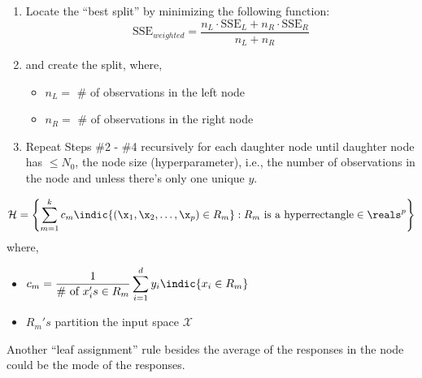 \documentclass[12pt]{article}
\begin{document}
\begin{enumerate}
\begin{tcolorbox}[colback=white, sharp corners]
\begin{enumerate}
\[
	\sum_{i \in node} \left(y_i - \ybar_{node} \right)^2
\]
\item[\#3:] Locate the ``best split'' by minimizing the following function:
\[
	\text{SSE}_{weighted} = \dfrac{n_L \cdot \text{SSE}_L + n_R \cdot \text{SSE}_R}{n_L + n_R}
\]
\item[\#4:] and create the split, where, 
\begin{itemize}
\item $n_L = $ \# of observations in the left node
\item $n_R = $ \# of observations in the right node
\end{itemize}

\item[\#5:] Repeat Steps \#2 - \#4 recursively for each daughter node until daughter node has $\leq N_0$, the node size (hyperparameter), i.e., the number of observations in the node and unless there's only one unique $y$. 
\end{enumerate}
\end{tcolorbox}


\begin{tcolorbox}[colback=white, sharp corners]
\[
	\mathcal{H} = \left\lbrace  \sum_{m = 1}^k c_m \indic{(\x_1, \x_2, \ldots, \x_p) \in R_m}: R_m \text{ is a hyperrectangle} \in \reals^p  \right\rbrace
\]
where, 
\begin{itemize}
\item $c_m = \dfrac{1}{ \text{\# of }x_i's \in R_m } \displaystyle \sum_{i=1}^{d} y_i \indic{x_i \in R_m} $
\item $R_m's$ partition the input space $\mathcal{X}$
\end{itemize}
\end{tcolorbox}


\begin{tcolorbox}[colback=white, sharp corners]
Another ``leaf assignment'' rule besides the average of the responses in the node could be the mode of the responses. 
\end{tcolorbox}


\end{enumerate}
\end{document}

